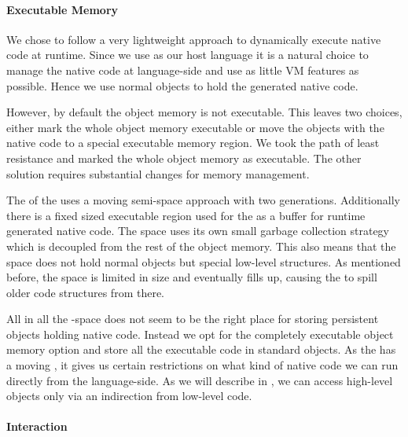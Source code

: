 \paragraph{Executable Memory}
 
We chose to follow a very lightweight approach to dynamically execute native code at runtime. 
Since we use \PH as our host language it is a natural choice to manage the native code at language-side and use as little VM features as possible.
Hence we use normal \PH objects to hold the generated native code.

However, by default the object memory is not executable.
This leaves two choices, either mark the whole object memory executable or move the objects with the native code to a special executable memory region.
We took the path of least resistance and marked the whole object memory as executable.
The other solution requires substantial changes for memory management. 

The \GC of the \PH \VM uses a moving semi-space approach with two generations.
Additionally there is a fixed sized executable region used for the \JIT as a buffer for runtime generated native code.
The \JIT space uses its own small garbage collection strategy which is decoupled from the rest of the object memory.
This also means that the \JIT space does not hold normal \PH objects but special low-level structures.
As mentioned before, the \JIT space is limited in size and eventually fills up, causing the \JIT to spill older code structures from there. 

All in all the \JIT-space does not seem to be the right place for storing persistent \PH objects holding native code.
Instead we opt for the completely executable object memory option and store all the executable code in standard \PH objects.
As the \VM has a moving \GC, it gives us certain restrictions on what kind of native code we can run directly from the language-side. 
As we will describe in , we can access high-level \PH objects only via an indirection from low-level code.

\paragraph{\VM Interaction}

